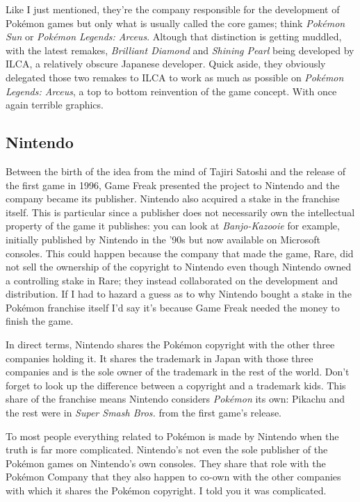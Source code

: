 \documentclass{book}
\begin{document}
Like I just mentioned, they’re the company responsible for the development of Pokémon games but only what is usually called the core games; think \emph{Pokémon Sun} or \emph{Pokémon Legends: Arceus}. Altough that distinction is getting muddled, with the latest remakes, \emph{Brilliant Diamond} and \emph{Shining Pearl} being developed by ILCA, a relatively obscure Japanese developer. Quick aside, they obviously delegated those two remakes to ILCA to work as much as possible on \emph{Pokémon Legends: Arceus}, a top to bottom reinvention of the game concept. With once again terrible graphics.

\subsection*{Nintendo}\nopagebreak[4]

Between the birth of the idea from the mind of Tajiri Satoshi and the release of the first game in 1996, Game Freak presented the project to Nintendo and the company became its publisher. Nintendo also acquired a stake in the franchise itself. This is particular since a publisher does not necessarily own the intellectual property of the game it publishes: you can look at \emph{Banjo-Kazooie} for example, initially published by Nintendo in the ’90s but now available on Microsoft consoles. This could happen because the company that made the game, Rare, did not sell the ownership of the copyright to Nintendo even though Nintendo owned a controlling stake in Rare; they instead collaborated on the development and distribution. If I had to hazard a guess as to why Nintendo bought a stake in the Pokémon franchise itself I’d say it’s because Game Freak needed the money to finish the game.

In direct terms, Nintendo shares the Pokémon copyright with the other three companies holding it. It shares the trademark in Japan with those three companies and is the sole owner of the trademark in the rest of the world. Don’t forget to look up the difference between a copyright and a trademark kids. This share of the franchise means Nintendo considers \emph{Pokémon} its own: Pikachu and the rest were in \emph{Super Smash Bros.} from the first game’s release.

To most people everything related to Pokémon is made by Nintendo when the truth is far more complicated. Nintendo’s not even the sole publisher of the Pokémon games on Nintendo’s own consoles. They share that role with the Pokémon Company that they also happen to co-own with the other companies with which it shares the Pokémon copyright. I told you it was complicated.
\end{document}
